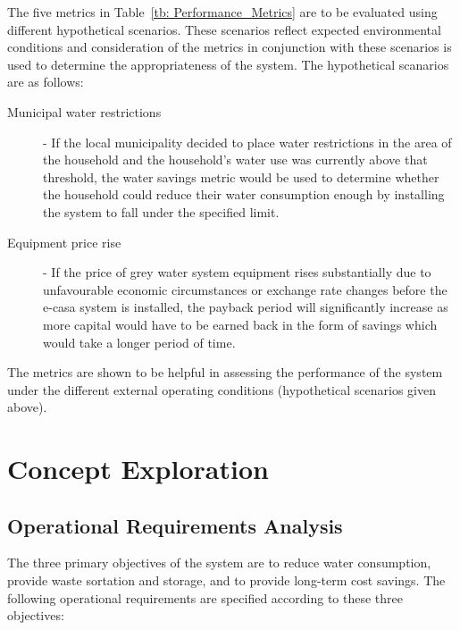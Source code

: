 \documentclass[a4paper,11pt,fleqn]{report}
\begin{document}
The five metrics in Table~\ref{tb: Performance_Metrics} are to be evaluated using different hypothetical scenarios. These scenarios reflect expected environmental conditions and consideration of the metrics in conjunction with these scenarios is used to determine the appropriateness of the system. The hypothetical scanarios are as follows:
%
\begin{description}
	\item[Municipal water restrictions] - If the local municipality decided to place water restrictions in the area of the household and the household's water use was currently above that threshold, the water savings metric would be used to determine whether the household could reduce their water consumption enough by installing the system to fall under the specified limit.
	\item[Equipment price rise] - If the price of grey water system equipment rises substantially due to unfavourable economic circumstances or exchange rate changes before the \ac{e-casa} system is installed, the payback period will significantly increase as more capital would have to be earned back in the form of savings which would take a longer period of time.
\end{description}

The metrics are shown to be helpful in assessing the performance of the system under the different external operating conditions (hypothetical scenarios given above). 

\section{Concept Exploration}
\subsection{Operational Requirements Analysis}
The three primary objectives of the system are to reduce water consumption, provide waste sortation and storage, and to provide long-term cost savings. The following operational requirements are specified according to these three objectives: 
\end{document}
